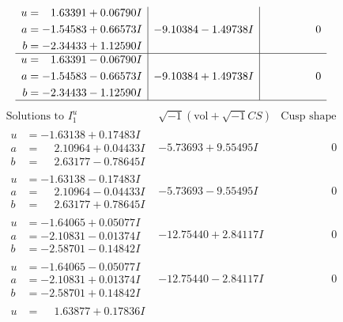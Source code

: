 \documentclass[1p]{elsarticle_modified}
\theoremstyle{definition}
\newcommand{\I}{\sqrt{-1}}
\begin{document}
$$\begin{array}{c|c|c}
\begin{aligned}
u &= \phantom{-}1.63391 + 0.06790 I \\
a &= -1.54583 + 0.66573 I \\
b &= -2.34433 + 1.12590 I\end{aligned}
 & -9.10384 - 1.49738 I & \phantom{-0.000000 } 0 \\ \hline\begin{aligned}
u &= \phantom{-}1.63391 - 0.06790 I \\
a &= -1.54583 - 0.66573 I \\
b &= -2.34433 - 1.12590 I\end{aligned}
 & -9.10384 + 1.49738 I & \phantom{-0.000000 } 0\\
 \hline 
 \end{array}$$\newpage$$\begin{array}{c|c|c}  
\text{Solutions to }I^u_{1}& \I (\text{vol} + \sqrt{-1}CS) & \text{Cusp shape}\\
 \hline 
\begin{aligned}
u &= -1.63138 + 0.17483 I \\
a &= \phantom{-}2.10964 + 0.04433 I \\
b &= \phantom{-}2.63177 - 0.78645 I\end{aligned}
 & -5.73693 + 9.55495 I & \phantom{-0.000000 } 0 \\ \hline\begin{aligned}
u &= -1.63138 - 0.17483 I \\
a &= \phantom{-}2.10964 - 0.04433 I \\
b &= \phantom{-}2.63177 + 0.78645 I\end{aligned}
 & -5.73693 - 9.55495 I & \phantom{-0.000000 } 0 \\ \hline\begin{aligned}
u &= -1.64065 + 0.05077 I \\
a &= -2.10831 - 0.01374 I \\
b &= -2.58701 - 0.14842 I\end{aligned}
 & -12.75440 + 2.84117 I & \phantom{-0.000000 } 0 \\ \hline\begin{aligned}
u &= -1.64065 - 0.05077 I \\
a &= -2.10831 + 0.01374 I \\
b &= -2.58701 + 0.14842 I\end{aligned}
 & -12.75440 - 2.84117 I & \phantom{-0.000000 } 0 \\ \hline\begin{aligned}
u &= \phantom{-}1.63877 + 0.17836 I \\

\end{aligned}
\end{array}$$
\end{document}
